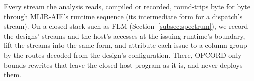 \label{subsec:closed}
Every stream the analysis reads, compiled or recorded, round-trips byte for byte through MLIR-AIE's runtime sequence (its intermediate form for a dispatch's stream).
On a closed stack such as FLM (Section~\ref{subsec:spectrum}), we record the designs' streams and the host's accesses at the issuing runtime's boundary, lift the streams into the same form, and attribute each issue to a column group by the routes decoded from the design's configuration.
There, OPCORD only bounds rewrites that leave the closed host program as it is, and never deploys them.

